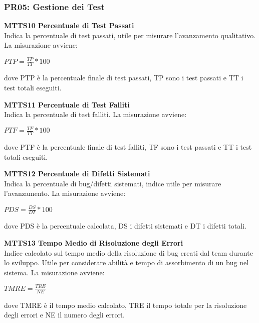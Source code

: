 \subsubsection{PR05: Gestione dei Test}
\begin{itemize}

	\item \textbf{MTTS10 Percentuale di Test Passati}\-\\
Indica la percentuale di test passati, utile per misurare l'avanzamento qualitativo. La misurazione avviene:
\begin{center}
	\item $PTP = \frac{TP}{TT}*100$
\end{center}
dove PTP è la percentuale finale di test passati, TP sono i test passati e TT i test totali eseguiti.

	\item \textbf{MTTS11 Percentuale di Test Falliti}\-\\
Indica la percentuale di test falliti. La misurazione avviene:
\begin{center}
	\item $PTF = \frac{TF}{TT}*100$
\end{center}
dove PTF è la percentuale finale di test falliti, TF sono i test passati e TT i test totali eseguiti.

	\item \textbf{MTTS12 Percentuale di Difetti Sistemati}\-\\
Indica la percentuale di bug/difetti sistemati, indice utile per misurare l'avanzamento. La misurazione avviene:
\begin{center}
	\item $PDS = \frac{DS}{DT}*100$
\end{center}
dove PDS è la percentuale calcolata, DS i difetti sistemati e DT i difetti totali.

	\item \textbf{MTTS13 Tempo Medio di Risoluzione degli Errori}\-\\
Indice calcolato sul tempo medio della risoluzione di bug creati dal team durante lo sviluppo. Utile per considerare abilità e tempo di assorbimento di un bug nel sistema. La misurazione avviene:
\begin{center}
	\item $TMRE = \frac{TRE}{NE}$
\end{center}
dove TMRE è il tempo medio calcolato, TRE il tempo totale per la risoluzione degli errori e NE il numero degli errori.


\end{itemize}

